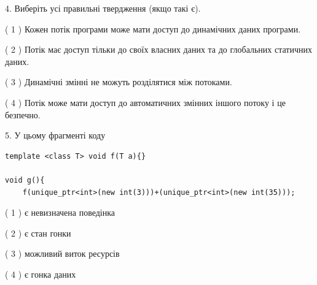 \documentclass[12pt, ukrainian]{article}
\begin{document}
\begin {large}
{%
4. Виберіть усі правильні твердження (якщо такі є).\par
\vspace{2mm}

( 1 ) Кожен потік програми може мати доступ до динамічних даних програми.%

( 2 ) Потік має доступ тільки до своїх власних даних та до глобальних статичних даних.%

( 3 ) Динамічні змінні не можуть розділятися між потоками.%

( 4 ) Потік може мати доступ до автоматичних змінних іншого потоку і це безпечно.%


5. У цьому фрагменті коду
\begin{verbatim}
template <class T> void f(T a){}

void g(){
    f(unique_ptr<int>(new int(3)))+(unique_ptr<int>(new int(35)));
\end{verbatim}

( 1 ) є невизначена поведінка%

( 2 ) є стан гонки%

( 3 ) можливий виток ресурсів%

( 4 ) є гонка даних%
}
\end {large}
\end{document}
